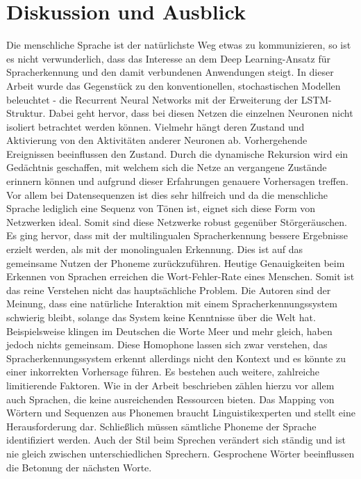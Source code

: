 \section{Diskussion und Ausblick}
Die menschliche Sprache ist der natürlichste Weg etwas zu kommunizieren, so ist es nicht verwunderlich, dass das Interesse an dem Deep Learning-Ansatz für Spracherkennung und den damit verbundenen Anwendungen steigt. In dieser Arbeit wurde das Gegenstück zu den konventionellen, stochastischen Modellen beleuchtet - die Recurrent Neural Networks mit der Erweiterung der LSTM-Struktur. Dabei geht hervor, dass bei diesen Netzen die einzelnen Neuronen nicht isoliert betrachtet werden können. Vielmehr hängt deren Zustand und Aktivierung von den Aktivitäten anderer Neuronen ab. Vorhergehende Ereignissen beeinflussen den Zustand. Durch die dynamische Rekursion wird ein Gedächtnis geschaffen, mit welchem sich die Netze an vergangene Zustände erinnern können und aufgrund dieser Erfahrungen genauere Vorhersagen treffen. Vor allem bei Datensequenzen ist dies sehr hilfreich und da die menschliche Sprache lediglich eine Sequenz von Tönen ist, eignet sich diese Form von Netzwerken ideal. Somit sind diese Netzwerke robust gegenüber Störgeräuschen. Es ging hervor, dass mit der multilingualen Spracherkennung bessere Ergebnisse erzielt werden, als mit der monolingualen Erkennung. Dies ist auf das gemeinsame Nutzen der Phoneme zurückzuführen. Heutige Genauigkeiten beim Erkennen von Sprachen erreichen die Wort-Fehler-Rate eines Menschen. Somit ist das reine Verstehen nicht das hauptsächliche Problem. Die Autoren sind der Meinung, dass eine natürliche Interaktion mit einem Spracherkennungssystem schwierig bleibt, solange das System keine Kenntnisse über die Welt hat. Beispielsweise klingen im Deutschen die Worte Meer und mehr gleich, haben jedoch nichts gemeinsam. Diese Homophone lassen sich zwar verstehen, das Spracherkennungssystem erkennt allerdings nicht den Kontext und es könnte zu einer inkorrekten Vorhersage führen. Es bestehen auch weitere, zahlreiche limitierende Faktoren. Wie in der Arbeit beschrieben zählen hierzu vor allem auch Sprachen, die keine ausreichenden Ressourcen bieten. Das Mapping von Wörtern und Sequenzen aus Phonemen braucht Linguistikexperten und stellt eine Herausforderung dar. Schließlich müssen sämtliche Phoneme der Sprache identifiziert werden. Auch der Stil beim Sprechen verändert sich ständig und ist nie gleich zwischen unterschiedlichen Sprechern. Gesprochene Wörter beeinflussen die Betonung der nächsten Worte.

